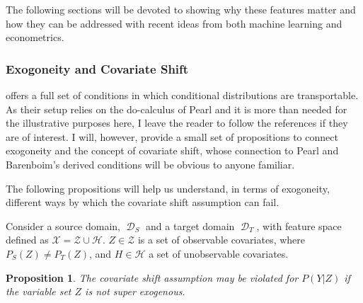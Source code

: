 \documentclass[a4paper,12pt]{article}
\newtheorem{prop}{Proposition}
\DeclareMathOperator*{\D}{\mathcal{D}}
\begin{document}
The following sections will be devoted to showing why these features matter and how they can be addressed with recent ideas from both machine learning and econometrics.





\subsubsection{Exogoneity and Covariate Shift}

\cite{Pearl2014} offers a full set of conditions in which conditional distributions are transportable. As their setup relies on the do-calculus of Pearl \parencite*{Pearl2000} and it is more than needed for the illustrative purposes here, I leave the reader to follow the references if they are of interest. I will, however, provide a small set of propositions to connect exogoneity and the concept of covariate shift, whose connection to Pearl and Barenboim's derived conditions will be obvious to anyone familiar.

The following propositions will help us understand, in terms of exogoneity, different ways by which the covariate shift assumption can fail.

Consider a source domain, $\D_S$ and a target domain $\D_T$, with feature space defined as $\mathcal{X} = \mathcal{Z} \cup \mathcal{H}$. $Z \in \mathcal{Z}$ is a set of observable covariates, where $P_S(Z) \neq P_T(Z)$, and $H \in \mathcal{H}$ a set of unobservable covariates.

\begin{prop}
  The covariate shift assumption may be violated for $P(Y|Z)$ if the variable set $Z$ is not super exogenous.
\end{prop}
\end{document}
